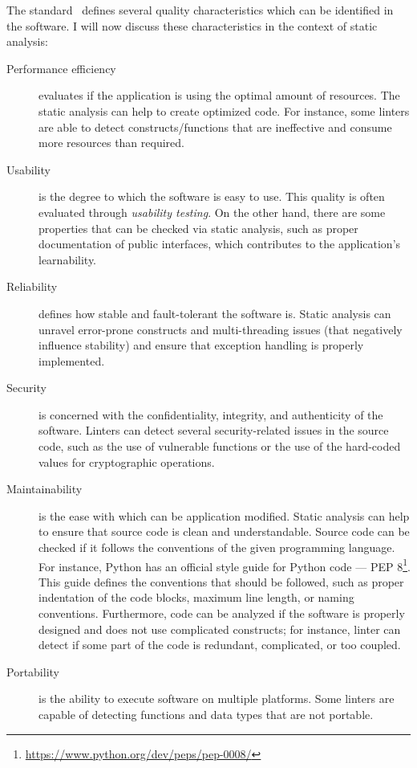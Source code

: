 \documentclass[digital,oneside,oldtable,nolof,nolot,nocover]{fithesis4}
\begin{document}
The standard~\cite{ISO25010} defines several quality characteristics which can be identified in the software.
I will now discuss these characteristics in the context of static analysis:
\begin{description}
\item[{Performance efficiency}] evaluates if the application is using the optimal amount of resources.
The static analysis can help to create optimized code.  For instance, some
linters are able to detect constructs/functions that are ineffective and
consume more resources than required.
\item[{Usability}] is the degree to which the software is easy to use. This quality is often evaluated through
\emph{usability testing}. On the other hand, there are some properties that can be checked via static analysis,
such as proper documentation of public interfaces, which contributes to the application's learnability.
\item[{Reliability}] defines how stable and fault-tolerant the software is.
Static analysis can unravel error-prone constructs and multi-threading issues
(that negatively influence stability) and ensure that exception handling is properly implemented.
\item[{Security}] is concerned with the confidentiality, integrity, and authenticity of the software.
Linters can detect several security-related issues in the source code, such as the use of vulnerable functions
or the use of the hard-coded values for cryptographic operations.
\item[{Maintainability}] is the ease with which can be application modified.
Static analysis can help to ensure that source code is clean and
understandable.  Source code can be checked if it follows the conventions of
the given programming language. For instance, Python has an official style
guide for Python code --- PEP 8\footnote{\url{https://www.python.org/dev/peps/pep-0008/}}.
This guide defines the conventions that should be followed, such as proper
indentation of the code blocks, maximum line length, or naming conventions.
Furthermore, code can be analyzed if the software is properly designed and
does not use complicated constructs; for instance, linter can detect if some
part of the code is redundant, complicated, or too coupled.
\item[{Portability}] is the ability to execute software on multiple platforms.
Some linters are capable of detecting functions and data types that are not portable.
\end{description}
\end{document}
